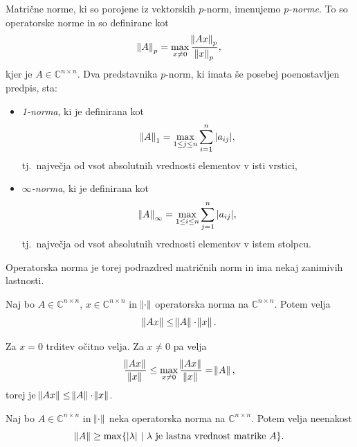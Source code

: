 \documentclass[mat1]{fmfdelo}
\newcommand{\C}{\mathbb C}
\begin{document}
\begin{zgled}
    Matrične norme, ki so porojene iz vektorskih $p$-norm, imenujemo \emph{$p$-norme}. To so operatorske norme in so definirane kot
    \begin{equation*}
        \norm{A}_p = \max_{x \neq 0} \frac{\norm{A x}_p}{\norm{x}_p},
    \end{equation*}
    kjer je $A \in \C^{n\times n}$. Dva predstavnika $p$-norm, ki imata še posebej poenostavljen predpis, sta:
    \begin{itemize}
        \item \emph{1-norma}, ki je definirana kot
        \begin{equation*}
            \norm{A}_1 = \max_{1 \leq j \leq n} \sum_{i=1}^n |a_{ij}|,
        \end{equation*}
        tj.\ največja od vsot absolutnih vrednosti elementov v isti vrstici,
        \item \emph{$\infty$-norma}, ki je definirana kot
        \begin{equation*}
            \norm{A}_\infty = \max_{1 \leq i \leq n} \sum_{j=1}^n |a_{ij}|,
        \end{equation*}
        tj.\ največja od vsot absolutnih vrednosti elementov v istem stolpcu.
    \end{itemize}
\end{zgled}
Operatorska norma je torej podrazdred matričnih norm in ima nekaj zanimivih lastnosti.
\begin{trditev}\label{trditevOperatorska}
    Naj bo $A \in \C^{n \times n}$, $x \in \C^{n \times n}$ in $\norm{\cdot}$ operatorska norma na $\C^{n \times n}$. Potem velja
    \begin{equation*}
        \norm{A x} \leq \norm{A} \cdot \norm{x}.
    \end{equation*}
\end{trditev}
\begin{dokaz}
    Za $x = 0$ trditev očitno velja. Za $x \neq 0$ pa velja
    \begin{equation*}
        \frac{\norm{A x}}{\norm{x}} \leq \max_{x \neq 0} \frac{\norm{A x}}{\norm{x}} = \norm{A},
    \end{equation*}
    torej je $\norm{A x} \leq \norm{A} \cdot \norm{x}$.
\end{dokaz}
\begin{posledica}\label{posledicaOperatorskaNorma}
    Naj bo $A \in \C^{n \times n}$ in $\norm{\cdot}$ neka operatorska norma na $\C^{n \times n}$. Potem velja neenakost
    \begin{equation*}
        \norm{A} \geq \max\{|\lambda|\ |\ \lambda\  \text{je lastna vrednost matrike}\  A\}.
    \end{equation*}
\end{posledica}
\end{document}
